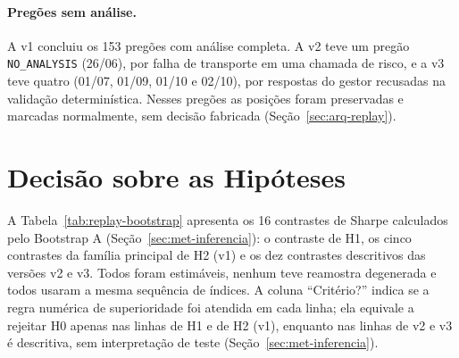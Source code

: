 \documentclass{eic-bcc-tcc}
\begin{document}
\paragraph{Pregões sem análise.} A v1 concluiu os 153 pregões com análise completa. A v2 teve um pregão \texttt{NO\_ANALYSIS} (26/06), por falha de transporte em uma chamada de risco, e a v3 teve quatro (01/07, 01/09, 01/10 e 02/10), por respostas do gestor recusadas na validação determinística. Nesses pregões as posições foram preservadas e marcadas normalmente, sem decisão fabricada (Seção~\ref{sec:arq-replay}).

\section{Decisão sobre as Hipóteses}
\label{sec:res-hipoteses}

A Tabela~\ref{tab:replay-bootstrap} apresenta os 16 contrastes de Sharpe calculados pelo Bootstrap A (Seção~\ref{sec:met-inferencia}): o contraste de H1, os cinco contrastes da família principal de H2 (v1) e os dez contrastes descritivos das versões v2 e v3. Todos foram estimáveis, nenhum teve reamostra degenerada e todos usaram a mesma sequência de índices. A coluna ``Critério?'' indica se a regra numérica de superioridade foi atendida em cada linha; ela equivale a rejeitar H0 apenas nas linhas de H1 e de H2 (v1), enquanto nas linhas de v2 e v3 é descritiva, sem interpretação de teste (Seção~\ref{sec:met-inferencia}).
\end{document}
